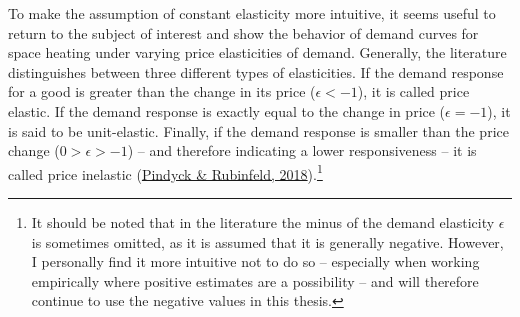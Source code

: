 \documentclass[12pt,twoside]{reedthesis}
\begin{document}
To make the assumption of constant elasticity more intuitive, it seems useful to return to the subject of interest and show the behavior of demand curves for space heating under varying price elasticities of demand. Generally, the literature distinguishes between three different types of elasticities. If the demand response for a good is greater than the change in its price (\(\epsilon < -1\)), it is called price elastic. If the demand response is exactly equal to the change in price (\(\epsilon = -1\)), it is said to be unit-elastic. Finally, if the demand response is smaller than the price change (\(0 > \epsilon > -1\)) -- and therefore indicating a lower responsiveness -- it is called price inelastic (\protect\hyperlink{ref-pindyck_rubinfeld18}{Pindyck \& Rubinfeld, 2018}).\footnote{It should be noted that in the literature the minus of the demand elasticity \(\epsilon\) is sometimes omitted, as it is assumed that it is generally negative. However, I personally find it more intuitive not to do so -- especially when working empirically where positive estimates are a possibility -- and will therefore continue to use the negative values in this thesis.}
\end{document}
